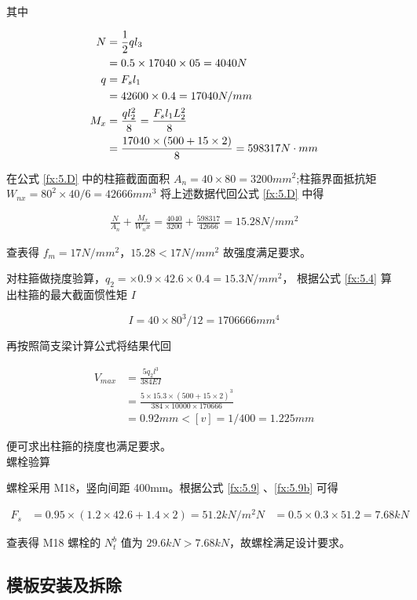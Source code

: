 其中

\begin{align}
\label{fx:5.E}
N&=\frac{1}{2}ql_3\\
&=0.5\times 17040\times 05=4040 N \notag\\
\label{fx:5.F}
q&=F_sl_1\\
&=42600\times 0.4=17040 N/mm \notag\\
\label{fx:5.G}
M_x&=\frac{ql_2^2}{8}=\frac{F_sl_1L_2^2}{8}\\
&=\frac{17040\times (500+15\times 2)}{8}=598317 N \cdot mm \notag
\end{align}

在公式 \ref{fx:5.D} 中的柱箍截面面积 $A_n=40\times 80=3200 mm^2$;柱箍界面抵抗矩 $W_{nx}=80^2\times 40/6=42666 mm^3$
将上述数据代回公式 \ref{fx:5.D} 中得

\begin{align*}
    \frac{N}{A_n}+\frac{M_x}{W_nx}=\frac{4040}{3200}+\frac{598317}{42666}=15.28 N/mm^2
\end{align*}

查表得 $f_m=17N/mm^2$，$15.28<17N/mm^2$ 故强度满足要求。

对柱箍做挠度验算，$q_2=\times 0.9\times 42.6\times 0.4=15.3 N/mm^2$，
根据公式 \ref{fx:5.4} 算出柱箍的最大截面惯性矩 $I$

\[
    I=40\times 80^3 /12=1706666 mm^4
\]

再按照简支梁计算公式将结果代回

\begin{align*}
    V_{max}&=\frac{5q_2l^3}{384EI}\\
    &=\frac{5\times 15.3\times (500+15\times 2)^3}{384\times 10000\times 170666}\\
    &=0.92mm<[v]=1/400=1.225mm
\end{align*}

便可求出柱箍的挠度也满足要求。\\

 螺栓验算

螺栓采用 M18，竖向间距 400mm。根据公式 \ref{fx:5.9} 、\ref{fx:5.9b} 可得

\begin{align*}
    F_s&=0.95\times(1.2\times 42.6+1.4\times 2)=51.2 kN/m^2
    N&=0.5\times 0.3\times 51.2=7.68 kN
\end{align*}

查表得 M18 螺栓的 $N^b_t$ 值为 $29.6 kN>7.68 kN$，故螺栓满足设计要求。

\subsection{模板安装及拆除}
